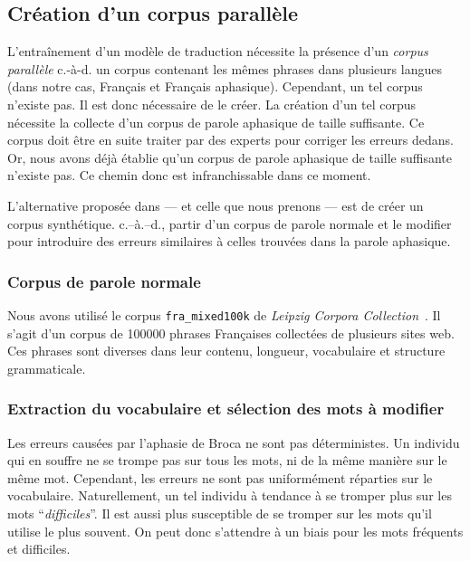 \subsection{Création d'un corpus parallèle}

L'entraînement d'un modèle de traduction nécessite la présence d'un \emph{corpus parallèle}
c.-à-d. un corpus contenant les mêmes phrases dans plusieurs langues (dans notre cas, Français et Français aphasique).
Cependant, un tel corpus n'existe pas. 
Il est donc nécessaire de le créer.
La création d'un tel corpus nécessite la collecte d'un corpus de parole aphasique de taille suffisante.
Ce corpus doit être en suite traiter par des experts pour corriger les erreurs dedans.
Or, nous avons déjà établie qu'un corpus de parole aphasique de taille suffisante n'existe pas.
Ce chemin donc est infranchissable dans ce moment.

L'alternative proposée dans \cite{Smaili_Langlois_Pribil_2022} --- et celle que nous prenons --- 
est de créer un corpus synthétique.
c.--à.--d., partir d'un corpus de parole normale et le modifier pour introduire 
des erreurs similaires à celles trouvées dans la parole aphasique.

\subsubsection{Corpus de parole normale}

Nous avons utilisé le corpus \texttt{fra\_mixed100k} de 
\emph{\foreignlanguage{english}{Leipzig Corpora Collection}}~\cite{Goldhahn_Eckart_Quasthoff}.
Il s'agit d'un corpus de 100000 phrases Françaises collectées de plusieurs sites web.
Ces phrases sont diverses dans leur contenu, longueur, vocabulaire et structure grammaticale.

\subsubsection{Extraction du vocabulaire et sélection des mots à modifier}

Les erreurs causées par l'aphasie de Broca ne sont pas déterministes.
Un individu qui en souffre ne se trompe pas sur tous les mots, ni de la même manière sur le même mot.
Cependant, les erreurs ne sont pas uniformément réparties sur le vocabulaire.
Naturellement, un tel individu à tendance à se tromper plus sur les mots ``\emph{difficiles}''.
Il est aussi plus susceptible de se tromper sur les mots qu'il utilise le plus souvent.
On peut donc s'attendre à un biais pour les mots fréquents et difficiles.

